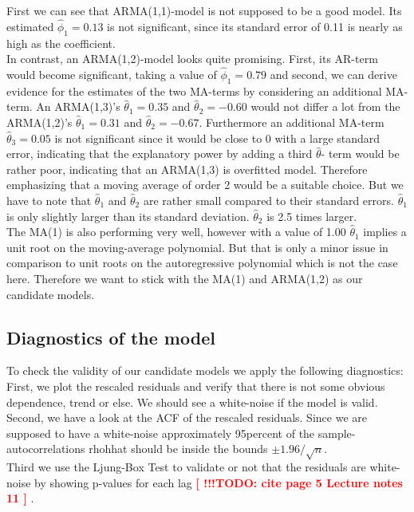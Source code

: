 \documentclass[11pt,a4paper]{article}
\newcommand{\TODO}[1]{%
    \textcolor{red}{ %
        \textbf{[ !!!TODO: #1 ]}%
    }%
    \PackageWarning{TODO:}{TODO: #1}%
}
\begin{document}
First we can see that ARMA(1,1)-model is not supposed to be a good model. Its estimated $\hat{\phi}_1=0.13$ is not significant, since its standard error of 0.11 is nearly as high as the coefficient.\\
In contrast, an ARMA(1,2)-model looks quite promising. First, its AR-term would become significant, taking a value of $\hat{\phi}_1=0.79$ and second, we can derive evidence for the estimates of the two MA-terms by considering an additional MA-term. An ARMA(1,3)'s $\hat{\theta}_1 = 0.35$ and $\hat{\theta}_2= -0.60$ would not differ a lot from the ARMA(1,2)'s $\hat{\theta}_1 = 0.31$ and $\hat{\theta}_2 = -0.67$. Furthermore an additional MA-term $\hat{\theta}_3 = 0.05$ is not significant since it would be close to 0 with a large standard error, indicating that the explanatory power by adding a third $\hat{\theta}$- term would be rather poor, indicating that an ARMA(1,3) is overfitted model. Therefore emphasizing that a moving average of order 2 would be a suitable choice.
But we have to note that $\hat{\theta}_1$ and $\hat{\theta}_2$ are rather small compared to their standard errors.
$\hat{\theta}_1$ is only slightly larger than its standard deviation.
$\hat{\theta}_2$ is 2.5 times larger.
\\
The MA(1) is also performing very well, however with a value of 1.00 $\hat{\theta}_1$ implies a unit root on the moving-average polynomial. But that is only a minor issue in comparison to unit roots on the autoregressive polynomial \cite[p.~42--83]{bd02} which is not the case here. Therefore we want to stick with the MA(1) and ARMA(1,2) as our candidate models.








\subsection{Diagnostics of the model}

To check the validity of our candidate models we apply the following diagnostics:\\
First, we plot the rescaled residuals and verify that there is not some obvious dependence, trend or else. We should see a white-noise if the model is valid.\\
Second, we have a look at the ACF of the rescaled residuals.
Since we are supposed to have a white-noise approximately 95percent of the sample-autocorrelations rhohhat should be inside the bounds $\pm 1.96 / \sqrt{n}$. \\
Third we use the Ljung-Box Test \citep{LjungBox78} to validate or not that the residuals are white-noise by showing p-values for each lag \TODO{cite page 5 Lecture notes 11}.
\end{document}
